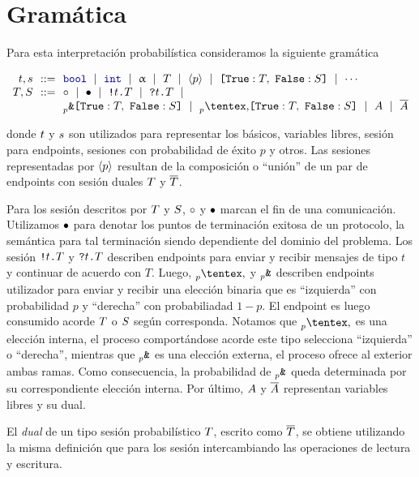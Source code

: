 \section{Gramática}

Para esta interpretación probabilística consideramos la siguiente gramática

\[
\begin{array}{@{}r@{~~}c@{~~}l@{}}
\TypeT, \TypeS & ::= &
\tbool
\rulemid \tint
\rulemid \tvar
\rulemid \SessionType
\rulemid \ClosedSessionType
\rulemid \BinaryLabels{\SessionTypeT}{\SessionTypeS}
\rulemid \cdots
\\
\SessionTypeT, \SessionTypeS & ::= &
\tend
\rulemid \tdone
\rulemid \Out\Type\SessionType
\rulemid \In\Type\SessionType
\rulemid
\\
	& &
\BinaryPBranch[p]\SessionTypeT\SessionTypeS
\rulemid \BinaryPChoice[p]\SessionTypeT\SessionTypeS
\rulemid \etvar
\rulemid \dual\etvar
\end{array}
\]

donde $t$ y $s$ son utilizados para representar los  básicos,
variables libres,  sesión para endpoints, sesiones con probabilidad de
éxito $p$ y otros. Las sesiones representadas por $\langle p \rangle$ resultan
de la composición o ``unión'' de un par de endpoints con  sesión duales
$T$ y $\overline{T}$.

Para los  sesión descritos por $T$ y $S$, ${\circ}$
y ${\bullet}$ marcan el fin de una comunicación. Utilizamos ${\bullet}$ para denotar
los puntos de terminación exitosa de un protocolo, la semántica para tal
terminación siendo dependiente del dominio del problema. Los  sesión
${\texttt{\upshape!}}{t}\texttt{\upshape.}T$ y ${\texttt{\upshape?}}{t}\texttt{\upshape.}T$ describen endpoints para
enviar y recibir mensajes de tipo $t$ y continuar de acuerdo con $T$. Luego,
$\PChoice$ y
$\PBranch$ describen endpoints utilizador para
enviar y recibir una elección binaria que es ``izquierda'' con probabilidad $p$
y ``derecha'' con probabiliadad $1 - p$. El endpoint es luego consumido acorde
$T$ o $S$ según corresponda. Notamos que $\PChoice{}{}$
es una elección interna, el proceso comportándose acorde este tipo selecciona
``izquierda'' o ``derecha'', mientras que $\PBranch$ es una elección
externa, el proceso ofrece al exterior ambas ramas. Como consecuencia, la
probabilidad de $\PBranch$ queda determinada por su correspondiente
elección interna. Por último, $A$ y $\overline{A}$ representan variables
libres y su dual.

El \emph{dual} de un tipo sesión probabilístico $T$, escrito como
$\overline{T}$, se obtiene utilizando la misma definición que para los
 sesión intercambiando las operaciones de lectura y escritura.

